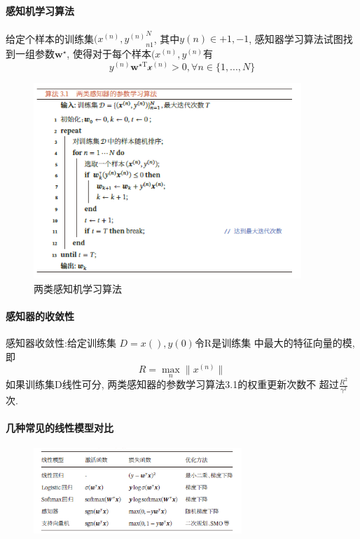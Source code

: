 \documentclass[a4paper]{article}
\theoremstyle{definition}
\numberwithin{equation}{section}
\begin{document}
\paragraph{感知机学习算法} 给定个样本的训练集${(x^{(n)}, y^{(n)}}^N_{n1}$, 其中$y(n)\in {+1, -1}$, 感知器学习算法试图找到一组参数$\mathbf{w}^{\star}$, 使得对于每个样本$(x^{(n)}, y^{(n)}$有
\begin{equation}
    y^{(n)} \mathbf{w}^{\star \mathrm{T} }  \mathcal{x}^{(n)}> 0,  \forall n \in \{ 1, ..., N \}
\end{equation}
\begin{figure}
    \centering
    \label{algorithm_perceptron}
    \includegraphics[width=0.9\textwidth]{algorithm_perceptron.png}
    \caption{两类感知机学习算法 }
\end{figure}

\paragraph{感知器的收敛性} 
 感知器收敛性:给定训练集 $D = {x(), y(0)}$令R是训练集
中最大的特征向量的模, 即$$R = \max_n \|x^{(n)}\|$$
如果训练集D线性可分, 两类感知器的参数学习算法3.1的权重更新次数不
超过$\frac{R^2}{\gamma^2}$次.

\paragraph{几种常见的线性模型对比} 
\begin{figure}
    \centering
    \includegraphics[width=0.7\textwidth]{linear_model.png}
    
\end{figure}
\newpage
\end{document}
